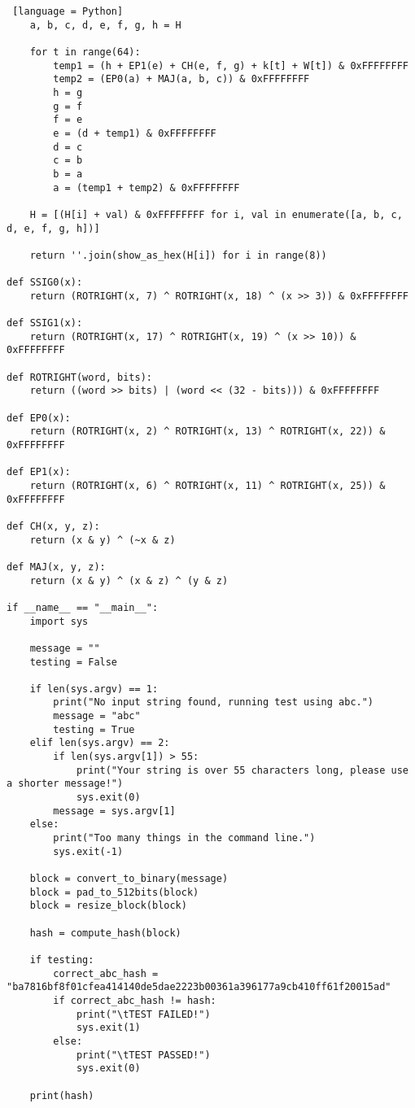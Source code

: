 \begin{lstlisting} [language = Python]
    a, b, c, d, e, f, g, h = H

    for t in range(64):
        temp1 = (h + EP1(e) + CH(e, f, g) + k[t] + W[t]) & 0xFFFFFFFF
        temp2 = (EP0(a) + MAJ(a, b, c)) & 0xFFFFFFFF
        h = g
        g = f
        f = e
        e = (d + temp1) & 0xFFFFFFFF
        d = c
        c = b
        b = a
        a = (temp1 + temp2) & 0xFFFFFFFF

    H = [(H[i] + val) & 0xFFFFFFFF for i, val in enumerate([a, b, c, d, e, f, g, h])]

    return ''.join(show_as_hex(H[i]) for i in range(8))

def SSIG0(x):
    return (ROTRIGHT(x, 7) ^ ROTRIGHT(x, 18) ^ (x >> 3)) & 0xFFFFFFFF

def SSIG1(x):
    return (ROTRIGHT(x, 17) ^ ROTRIGHT(x, 19) ^ (x >> 10)) & 0xFFFFFFFF

def ROTRIGHT(word, bits):
    return ((word >> bits) | (word << (32 - bits))) & 0xFFFFFFFF

def EP0(x):
    return (ROTRIGHT(x, 2) ^ ROTRIGHT(x, 13) ^ ROTRIGHT(x, 22)) & 0xFFFFFFFF

def EP1(x):
    return (ROTRIGHT(x, 6) ^ ROTRIGHT(x, 11) ^ ROTRIGHT(x, 25)) & 0xFFFFFFFF

def CH(x, y, z):
    return (x & y) ^ (~x & z)

def MAJ(x, y, z):
    return (x & y) ^ (x & z) ^ (y & z)

if __name__ == "__main__":
    import sys

    message = ""
    testing = False

    if len(sys.argv) == 1:
        print("No input string found, running test using abc.")
        message = "abc"
        testing = True
    elif len(sys.argv) == 2:
        if len(sys.argv[1]) > 55:
            print("Your string is over 55 characters long, please use a shorter message!")
            sys.exit(0)
        message = sys.argv[1]
    else:
        print("Too many things in the command line.")
        sys.exit(-1)

    block = convert_to_binary(message)
    block = pad_to_512bits(block)
    block = resize_block(block)

    hash = compute_hash(block)

    if testing:
        correct_abc_hash = "ba7816bf8f01cfea414140de5dae2223b00361a396177a9cb410ff61f20015ad"
        if correct_abc_hash != hash:
            print("\tTEST FAILED!")
            sys.exit(1)
        else:
            print("\tTEST PASSED!")
            sys.exit(0)

    print(hash)

    
\end{lstlisting}
